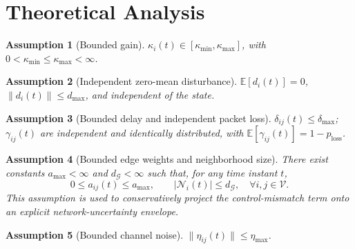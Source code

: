 \documentclass[10pt]{article}
\newtheorem{assumption}{Assumption}[section]
\newcommand{\kmax}{\kappa_{\max}}
\newcommand{\kmin}{\kappa_{\min}}
\newcommand{\ploss}{p_{\text{loss}}}
\newcommand{\dmax}{d_{\max}}
\newcommand{\amax}{a_{\max}}
\newcommand{\gdeg}{d_{\mathcal{G}}}
\begin{document}

\section{Theoretical Analysis}\label{sec:thm}

\begin{assumption}[Bounded gain]\label{ass:gain}
  $\kappa_i(t)\in[\kmin,\kmax]$, with $0<\kmin\leq\kmax<\infty$.
\end{assumption}

\begin{assumption}[Independent zero-mean disturbance]\label{ass:dist}
  $\mathbb{E}[d_i(t)]=0$, $\|d_i(t)\|\leq\dmax$, and independent of the state.
\end{assumption}

\begin{assumption}[Bounded delay and independent packet loss]\label{ass:packet}
  $\delta_{ij}(t)\leq\delta_{\max}$; $\gamma_{ij}(t)$ are independent and identically distributed, with $\mathbb{E}[\gamma_{ij}(t)]=1-\ploss$.
\end{assumption}

\begin{assumption}[Bounded edge weights and neighborhood size]\label{ass:topobound}
  There exist constants $\amax<\infty$ and $\gdeg<\infty$ such that, for any time instant $t$,
  \[
    0\leq a_{ij}(t)\leq \amax,\qquad |\mathcal{N}_i(t)|\leq \gdeg,\quad \forall i,j\in\mathcal{V}.
  \]
  This assumption is used to conservatively project the control-mismatch term onto an explicit network-uncertainty envelope.
\end{assumption}

\begin{assumption}[Bounded channel noise]\label{ass:channel}
  $\|\eta_{ij}(t)\|\leq\eta_{\max}$.
\end{assumption}
\end{document}
